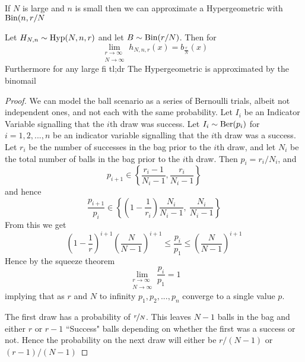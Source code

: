 \begin{lemma}
    If $N$ is large and $n$ is small then we can approximate a Hypergeometric with $\textup{Bin}(n,r/N$


    Let $H_{N,n}\sim\textup{Hyp}(N,n,r)$ and let $B\sim\textup{Bin}(r/N)$. Then for 
    \[
        \lim_{\substack{r\to\infty\\N\to\infty}} h_{N,n,r}(x)=b_{\frac r N}(x)
    \]
    Furthermore for any large fi
    \todo
    tl;dr The Hypergeometric is approximated by the binomail


    \begin{proof}


        We can model the ball scenario as a series of Bernoulli trials, albeit not independent ones, and not each with the same probability. Let $I_i$ be an Indicator Variable signalling that the $i$th draw was success. Let $I_i\sim\textup{Ber}(p_i)$ for $i=1,2,...,n$ be an indicator variable signalling that the $i$th draw was a success. Let $r_i$ be the number of successes in the bag prior to the $i$th draw, and let $N_i$ be the total number of balls in the bag prior to the $i$th draw. Then $p_i=r_i/N_i$, and 
        \[
            p_{i+1}\in\left\{\frac{r_i-1}{N_i-1}, \frac{r_i}{N_i-1}\right\}
        \]
        and hence
        \[
            \frac{p_{i+1}}{p_i}\in\left\{\left(1-\frac{1}{r_i}\right)\frac{N_i}{N_i-1},\ \frac{N_i}{N_i-1}\right\}
        \]
        From this we get
        \[
            \left(1-\frac{1}{r}\right)^{i+1}\left(\frac N {N-1}\right)^{i+1} \le \frac{p_i}{p_1}\le \left(\frac N {N-1}\right)^{i+1}
        \]
        Hence by the squeeze theorem 
        \[
            \lim_{\substack{r\to\infty\\N\to\infty}}\frac{p_i}{p_1}=1
        \]
        implying that as $r$ and $N$ to infinity $p_1,p_2,...,p_n$ converge to a single value $p$. 

        
        The first draw has a probability of $\nicefrac r N$. This leaves $N-1$ balls in the bag and either $r$ or $r-1$ ``Success" balls depending on whether the first was a success or not. Hence the probability on the next draw will either be $r/(N-1)$ or $(r-1)/(N-1)$
    \end{proof}
    
\end{lemma}



